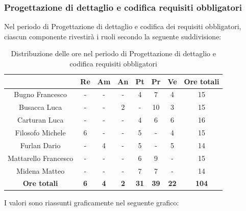 
\subsubsection{Progettazione di dettaglio e codifica requisiti obbligatori}
Nel periodo di Progettazione di dettaglio e codifica dei requisiti obbligatori, ciascun componente rivestirà i ruoli secondo la seguente suddivisione:
   
   \begin{table}[H]
       \centering
       \renewcommand{\arraystretch}{1.8}
       \begin{tabular}{c|c|c|c|c|c|c|c}
         \rowcolor[HTML]{125E28} 
         \multicolumn{1}{c}{\color[HTML]{FFFFFF}\textbf{ Nominativo }}
         & \multicolumn{1}{c}{\color[HTML]{FFFFFF}\textbf{ Re }}
         & \multicolumn{1}{c}{\color[HTML]{FFFFFF}\textbf{ Am}}
         & \multicolumn{1}{c}{\color[HTML]{FFFFFF}\textbf{ An }}
         & \multicolumn{1}{c}{\color[HTML]{FFFFFF}\textbf{ Pt }}
         & \multicolumn{1}{c}{\color[HTML]{FFFFFF}\textbf{ Pr }}
         & \multicolumn{1}{c}{\color[HTML]{FFFFFF}\textbf{ Ve }}
         & \multicolumn{1}{c}{\color[HTML]{FFFFFF}\textbf{ Ore totali }}\\
         \hline
         Bugno Francesco        & - & - & - & 4 & 7 & 4 & 15\\
         Busacca Luca           & - & - & 2 & - & 10 & 3 & 15\\
         Carturan Luca          & - & - & - & 4 & 6 & 6 & 16\\
         Filosofo Michele       & 6 & - & - & 5 & - & 4 & 15\\
         Furlan Dario           & - & 4 & - & 5 & - & 5 & 14\\
         Mattarello Francesco   & - & - & - & 6 & 9 & - & 15\\
         Midena Matteo          & - & - & - & 7 & 7 & - & 14\\
         \textbf{Ore totali} & \textbf{6} & \textbf{4} & \textbf{2} & \textbf{31} & \textbf{39} & \textbf{22} & \textbf{104}
       \end{tabular}
       \caption{Distribuzione delle ore nel periodo di Progettazione di dettaglio e codifica requisiti obbligatori}
     \end{table}
   
   I valori sono riassunti graficamente nel seguente grafico:
   
